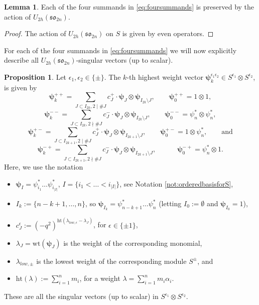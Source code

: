 \documentclass[10pt]{amsart}
\numberwithin{equation}{section}
\theoremstyle{definition}
\newtheorem{lemma}[theorem]{Lemma}
\newtheorem{proposition}[theorem]{Proposition}
\newcommand{\son}[1][2n]{\mathfrak{so}_{#1}}
\newcommand{\wt}{\mathrm{wt}}
\newcommand{\hgt}{\mathrm{ht}}
\newcommand{\hwp}{\boldsymbol{\psi}}
\begin{document}
\begin{lemma}
    Each of the four summands in \eqref{eq:foursummands} is preserved by the action of $U_{2h}(\son)$.
\end{lemma}
\begin{proof}
The action of $U_{2h}(\son)$ on $S$ is given by even operators. 
\end{proof}

For each of the four summands in \eqref{eq:foursummands} we will now explicitly describe all $U_{2h}(\son)$-singular vectors (up to scalar).

\begin{proposition}\label{high_vect}
    Let $\epsilon_1, \epsilon_2 \in \{\pm\}$. The $k$-th highest weight vector $\hwp_k^{\epsilon_1\epsilon_2}\in S^{\epsilon_1}\otimes S^{\epsilon_2}$, is given by
\begin{equation}\label{eq:highvect++}
    \hwp_{k}^{++}=\sum_{J\subset I_{2k},2\mid\#J} c^{+}_J\cdot \hwp_{J}\otimes \hwp_{I_{2k}\setminus J}, \qquad \hwp_0^{++}=1\otimes 1,
\end{equation}
\begin{equation}
    \hwp^{--}_k = \sum_{J\subset I_{2k},2\nmid\#J} c^{-}_J\cdot \hwp_{J}\otimes \hwp_{I_{2k}\setminus J}, \qquad  \hwp_0^{--}=\psi_n^{*}\otimes \psi_n^{*}, 
\end{equation}
\begin{equation}
    \hwp^{+-}_k = \sum_{J\subset I_{2k+1},2\mid\#J} c^{+}_J\cdot \hwp_{J}\otimes \hwp_{I_{2k+1}\setminus J}, \qquad  \hwp_0^{+-}=1\otimes \psi_n^{*}, \qquad \text{and}
\end{equation}
\begin{equation}
\hwp^{-+}_k = \sum_{J\subset I_{2k+1},2\nmid\#J} c^{-}_J\cdot \hwp_{J}\otimes \hwp_{I_{2k+1}\setminus J}, \qquad \quad \hwp_0^{-+}=\psi_n^{*}\otimes 1.
\end{equation}
Here, we use the notation
\begin{itemize}
    \item $\hwp_I=\psi_{i_1}^*\dots \psi_{i_{|I|}}^*$, $I=\{i_1 < \dots < i_{|I|}\}$, see Notation \ref{not:orderedbasisforS},
    \item $I_{k}:=\{n-k+1,\dots,n\}$, so $\hwp_{I_k}=\psi_{n-k+1}^{*}\dots\psi_{n}^{*}$ (letting $I_0:=\emptyset$ and $\hwp_{I_0} = 1$),
    \item $c^{\epsilon}_J:=(-q^2)^{\hgt(\lambda_{low, \epsilon} -\lambda_J)}$, for $\epsilon\in \{\pm 1\}$,
    \item $\lambda_J = \wt (\hwp_{J})$ is the weight of the corresponding monomial,
    \item $\lambda_{low,\pm}$ is the lowest weight of the corresponding module $S^{\pm}$, and
    \item $\hgt(\lambda):=\sum_{i=1}^{n}m_i$, for a weight $\lambda=\sum_{i=1}^{n} m_i \alpha_i$.
\end{itemize}
These are all the singular vectors (up to scalar) in $S^{\epsilon_1}\otimes S^{\epsilon_2}$.
\end{proposition}
\end{document}
